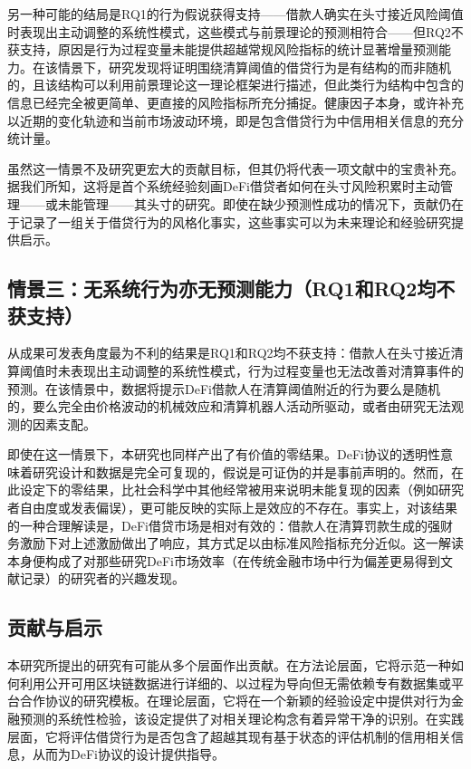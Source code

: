 另一种可能的结局是RQ1的行为假说获得支持——借款人确实在头寸接近风险阈值时表现出主动调整的系统性模式，这些模式与前景理论的预测相符合——但RQ2不获支持，原因是行为过程变量未能提供超越常规风险指标的统计显著增量预测能力。在该情景下，研究发现将证明围绕清算阈值的借贷行为是有结构的而非随机的，且该结构可以利用前景理论这一理论框架进行描述，但此类行为结构中包含的信息已经完全被更简单、更直接的风险指标所充分捕捉。健康因子本身，或许补充以近期的变化轨迹和当前市场波动环境，即是包含借贷行为中信用相关信息的充分统计量。

虽然这一情景不及研究更宏大的贡献目标，但其仍将代表一项文献中的宝贵补充。据我们所知，这将是首个系统经验刻画DeFi借贷者如何在头寸风险积累时主动管理——或未能管理——其头寸的研究。即使在缺少预测性成功的情况下，贡献仍在于记录了一组关于借贷行为的风格化事实，这些事实可以为未来理论和经验研究提供启示。

\subsection{情景三：无系统行为亦无预测能力（RQ1和RQ2均不获支持）}

从成果可发表角度最为不利的结果是RQ1和RQ2均不获支持：借款人在头寸接近清算阈值时未表现出主动调整的系统性模式，行为过程变量也无法改善对清算事件的预测。在该情景中，数据将提示DeFi借款人在清算阈值附近的行为要么是随机的，要么完全由价格波动的机械效应和清算机器人活动所驱动，或者由研究无法观测的因素支配。

即使在这一情景下，本研究也同样产出了有价值的零结果。DeFi协议的透明性意味着研究设计和数据是完全可复现的，假说是可证伪的并是事前声明的。然而，在此设定下的零结果，比社会科学中其他经常被用来说明未能复现的因素（例如研究者自由度或发表偏误），更可能反映的实际上是效应的不存在。事实上，对该结果的一种合理解读是，DeFi借贷市场是相对有效的：借款人在清算罚款生成的强财务激励下对上述激励做出了响应，其方式足以由标准风险指标充分近似。这一解读本身便构成了对那些研究DeFi市场效率（在传统金融市场中行为偏差更易得到文献记录）的研究者的兴趣发现。

\subsection{贡献与启示}

本研究所提出的研究有可能从多个层面作出贡献。在方法论层面，它将示范一种如何利用公开可用区块链数据进行详细的、以过程为导向但无需依赖专有数据集或平台合作协议的研究模板。在理论层面，它将在一个新颖的经验设定中提供对行为金融预测的系统性检验，该设定提供了对相关理论构念有着异常干净的识别。在实践层面，它将评估借贷行为是否包含了超越其现有基于状态的评估机制的信用相关信息，从而为DeFi协议的设计提供指导。

